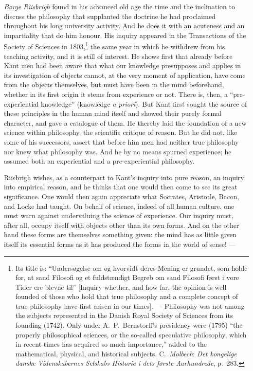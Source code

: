 \documentclass[12pt,a4paper]{book}
\newcommand{\opage}[1]{\marginnote{\footnotesize\textit{[#1]}}}
\begin{document}
\emph{Børge Riisbrigh} found in his advanced old age the time and the inclination to
discuss the philosophy that supplanted the doctrine he had proclaimed throughout
his long university activity. And he does it with an acuteness and an impartiality
that do him honour. His inquiry appeared in the Transactions of the Society of
Sciences in 1803,\footnote{Its title is: ``Undersøgelse om og hvorvidt deres Mening
er grundet, som holde for, at sand Filosofi og et fuldstændigt Begreb om sand
Filosofi først i vore Tider ere blevne til'' [Inquiry whether, and how far, the
opinion is well founded of those who hold that true philosophy and a complete
concept of true philosophy have first arisen in our times]. --- Philosophy was not
among the subjects represented in the Danish Royal Society of Sciences from its
founding (1742). Only under A.\ P.\ Bernstorff's presidency were (1795) ``the
properly philosophical sciences, or the so-called speculative philosophy, which in
recent times has acquired so much importance,'' added to the mathematical, physical,
and historical subjects. C.\ \emph{Molbech}: \emph{Det kongelige danske Videnskabernes
Selskabs Historie i dets første Aarhundrede}, p.~283.} the same year in which he
withdrew from his teaching activity, and it is still of interest. He shows first
that already before Kant men had been aware that what our knowledge presupposes and
applies in its investigation of objects cannot, at the very moment of application,
have come from the objects themselves, but must have been in the mind beforehand,
whether in its first origin it stems from experience or not. There is, then, a
``pre-experiential knowledge'' (knowledge \emph{a priori}). But Kant first sought
the source of these principles in the human mind itself and showed their purely
formal character, and gave a catalogue of them. He thereby laid the foundation of a
new science within philosophy, the scientific critique of reason. But he did not,
like some of his successors, assert that before him men had neither true philosophy
nor knew what philosophy was. And he \opage{36}by no means spurned experience; he assumed both
an experiential and a pre-experiential philosophy.

Riisbrigh wishes, as a counterpart to Kant's inquiry into pure reason, an inquiry
into empirical reason, and he thinks that one would then come to see its great
significance. One would then again appreciate what Socrates, Aristotle, Bacon, and
Locke had taught. On behalf of science, indeed of all human culture, one must warn
against undervaluing the science of experience. Our inquiry must, after all, occupy
itself with objects other than its own forms. And on the other hand these forms are
themselves something given: the mind has as little given itself its essential forms
as it has produced the forms in the world of sense! ---
\end{document}
